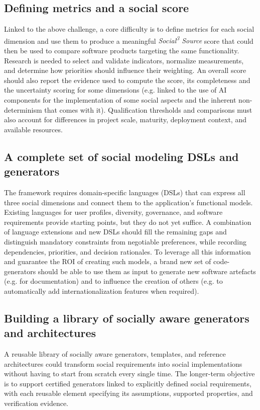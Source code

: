\documentclass[11pt,a4paper]{article}
\newcommand{\socialsource}{\texorpdfstring{\textit{Social\textsuperscript{3} Source}}{Social3 Source}}
\begin{document}
\subsection{Defining metrics and a social score}
Linked to the above challenge, a core difficulty is to define metrics for each social dimension and use them to produce a meaningful \socialsource{} score that could then be used to compare software products targeting the same functionality. 
Research is needed to select and validate indicators, normalize measurements, and determine how priorities should influence their weighting.
An overall score should also report the evidence used to compute the score, its completeness and the uncertainty scoring for some dimensions (e.g. linked to the use of AI components for the implementation of some social aspects and the inherent non-determinism that comes with it).
Qualification thresholds and comparisons must also account for differences in project scale, maturity, deployment context, and available resources.

\subsection{A complete set of social modeling  DSLs and generators}

The framework requires domain-specific languages (DSLs) that can express all three social dimensions and connect them to the application's functional models.
Existing languages for user profiles, diversity, governance, and software requirements provide starting points, but they do not yet suffice. 
A combination of language extensions and new DSLs should fill the remaining gaps and distinguish mandatory constraints from negotiable preferences, while recording dependencies, priorities, and decision rationales.
To leverage all this information and guarantee the ROI of creating such models, a brand new set of code-generators should be able to use them as input to generate new software artefacts (e.g. for documentation) and to influence the creation of others (e.g. to automatically add internationalization features when required). 

\subsection{Building a library of socially aware generators and architectures}

A reusable library of socially aware generators, templates, and reference architectures could transform social requirements into social implementations without having to start from scratch every single time.
The longer-term objective is to support certified generators linked to explicitly defined social requirements, with each reusable element specifying its assumptions, supported properties, and verification evidence.
\end{document}
